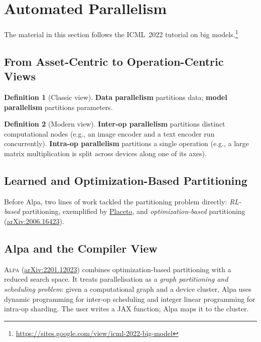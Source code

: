 \documentclass[11pt,a4paper]{article}
\theoremstyle{definition}
\newtheorem{definition}{Definition}[section]
\theoremstyle{remark}
\theoremstyle{plain}
\begin{document}
\section{Automated Parallelism}

The material in this section follows the ICML~2022 tutorial on big
models.\footnote{\url{https://sites.google.com/view/icml-2022-big-model}}

\subsection{From Asset-Centric to Operation-Centric Views}

\begin{definition}[Classic view]
\textbf{Data parallelism} partitions data; \textbf{model parallelism}
partitions parameters.
\end{definition}

\begin{definition}[Modern view]
\textbf{Inter-op parallelism} partitions distinct computational nodes
(e.g., an image encoder and a text encoder run concurrently).
\textbf{Intra-op parallelism} partitions a single operation (e.g., a
large matrix multiplication is split across devices along one of its
axes).
\end{definition}

\subsection{Learned and Optimization-Based Partitioning}

Before Alpa, two lines of work tackled the partitioning problem directly:
\emph{RL-based} partitioning, exemplified by
\href{https://people.csail.mit.edu/hongzi/content/publications/placeto-neurips19.pdf}{Placeto},
and \emph{optimization-based} partitioning
(\href{https://arxiv.org/abs/2006.16423}{arXiv:2006.16423}).

\subsection{Alpa and the Compiler View}

\textsc{Alpa} (\href{https://arxiv.org/abs/2201.12023}{arXiv:2201.12023})
combines optimization-based partitioning with a reduced search space. It
treats parallelisation as a \emph{graph partitioning and scheduling
problem}: given a computational graph and a device cluster, Alpa uses
dynamic programming for inter-op scheduling and integer linear
programming for intra-op sharding. The user writes a JAX function; Alpa
maps it to the cluster.
\end{document}
